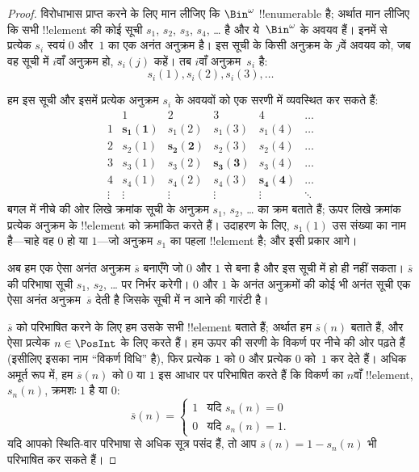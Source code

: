 \documentclass[../../../include/open-logic-section]{subfiles}
\begin{document}
\begin{proof}
विरोधाभास प्राप्त करने के लिए मान लीजिए कि $\Bin^\omega$
!!{enumerable} है; अर्थात मान लीजिए कि सभी !!{element} की कोई सूची
$s_{1}$, $s_{2}$, $s_{3}$, $s_{4}$, \dots{} है और ये~$\Bin^\omega$ के
अवयव हैं। इनमें से प्रत्येक
$s_i$ स्वयं $0$ और~$1$ का एक अनंत अनुक्रम है। इस सूची के किसी अनुक्रम के
$j$वें अवयव को, जब वह सूची में $i$वाँ अनुक्रम हो, $s_i(j)$ कहें। तब $i$वाँ
अनुक्रम~$s_i$ है:
\[
s_i(1), s_i(2), s_i(3), \dots
\]

हम इस सूची और इसमें प्रत्येक अनुक्रम $s_i$ के अवयवों को एक सरणी में व्यवस्थित
कर सकते हैं:
\[
\begin{array}{c|c|c|c|c|c}
& 1 & 2 & 3 & 4 & \dots \\\hline
1 & \mathbf{s_{1}(1)} & s_{1}(2) & s_{1}(3) & s_1(4) & \dots \\\hline
2 & s_{2}(1)& \mathbf{s_{2}(2)} & s_2(3) & s_2(4) & \dots \\\hline
3 & s_{3}(1)& s_{3}(2) & \mathbf{s_3(3)} & s_3(4) & \dots \\\hline
4 & s_{4}(1)& s_{4}(2) & s_4(3) & \mathbf{s_4(4)} & \dots \\\hline
\vdots & \vdots & \vdots & \vdots & \vdots & \mathbf{\ddots}
\end{array}
\]
बगल में नीचे की ओर लिखे क्रमांक सूची के अनुक्रम $s_1$, $s_2$, \dots{} का
क्रम बताते हैं; ऊपर लिखे क्रमांक प्रत्येक अनुक्रम के !!{element} को क्रमांकित
करते हैं। उदाहरण के लिए, $s_{1}(1)$ उस संख्या का नाम है---चाहे वह $0$ हो या
$1$---जो अनुक्रम $s_{1}$ का पहला !!{element} है; और इसी प्रकार आगे।

अब हम एक ऐसा अनंत अनुक्रम $\overline{s}$ बनाएँगे जो $0$ और $1$ से बना है और
इस सूची में हो ही नहीं सकता। $\overline{s}$ की परिभाषा सूची $s_1$, $s_2$, \dots{} पर
निर्भर करेगी। $0$ और $1$ के अनंत अनुक्रमों की कोई भी अनंत सूची एक ऐसा अनंत
अनुक्रम~$\overline{s}$ देती है जिसके सूची में न आने की गारंटी है।

$\overline{s}$ को परिभाषित करने के लिए हम उसके सभी !!{element} बताते हैं;
अर्थात हम $\overline{s}(n)$ बताते हैं, और ऐसा प्रत्येक $n \in \PosInt$ के
लिए करते हैं। हम ऊपर
की सरणी के विकर्ण पर नीचे की ओर पढ़ते हैं (इसीलिए इसका नाम ``विकर्ण विधि''
है), फिर प्रत्येक $1$ को $0$ और प्रत्येक $0$ को~$1$ कर देते हैं। अधिक अमूर्त
रूप में, हम $\overline{s}(n)$ को $0$ या $1$ इस आधार पर परिभाषित करते हैं कि
विकर्ण का $n$वाँ !!{element}, $s_n(n)$, क्रमशः $1$ है या $0$:
\[
\overline{s}(n) =
\begin{cases}
1 & \text{यदि $s_{n}(n) = 0$}\\
0 & \text{यदि $s_{n}(n) = 1$}.
\end{cases}
\]
यदि आपको स्थिति-वार परिभाषा से अधिक सूत्र पसंद हैं, तो आप
$\overline{s}(n) = 1 - s_n(n)$ भी परिभाषित कर सकते हैं।


\end{proof}
\end{document}
